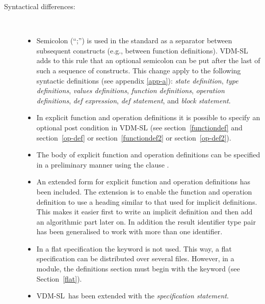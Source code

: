 \documentclass[\pformat,12pt]{article}
\newcommand{\vdmslpp}[2]{%
#1
}
\newcommand{\vdmsl}{VDM-SL}
\newcommand{\vdmpp}{VDM++}
\begin{document}
\begin{description}
\item[Syntactical differences:]\mbox{}\\
  \begin{itemize}
  
  \item Semicolon (``;'') is used in the standard as a separator
    between subsequent constructs (e.g., between function
    definitions).  \vdmslpp{\vdmsl}{\vdmpp} adds to this rule that
    an optional semicolon can be put after the last of such a sequence
    of constructs. This change apply to the following syntactic
    definitions (see appendix \ref{app-a}): \vdmslpp{{\em state
    definition},}{} {\em type definitions}, {\em values definitions},
    {\em function definitions}, {\em operation definitions}, {\em def
    expression}, {\em def statement}, and {\em block statement}.

  \item In explicit function and operation definitions it is possible
    to specify an optional post condition in 
    \vdmslpp{VDM-SL}{\vdmpp} (see section~\ref{functiondef} and
    section~\ref{op-def} or section~\ref{functiondef2} or
    section~\ref{op-def2}).

  \item The body of explicit function and operation definitions can be
    specified in a preliminary manner using the \vdmslpp{clause}{clauses
    \keyw{is subclass responsibility} and} .

    
  \item An extended form for explicit function and operation
    definitions has been included. The extension is to enable the
    function and operation definition to use a heading similar to that
    used for implicit definitions. This makes it easier first to write
    an implicit definition and then add an algorithmic part later
    on. In addition the result identifier type pair has been
    generalised to work with more than one identifier.

  \item In a flat specification the keyword  is not used.
    This way, a flat specification can be distributed over several files.
    However, in a module, the definitions section must begin with the
    keyword  (see Section~\ref{flat}).

  \item  \vdmsl\ has been extended with the {\em specification statement}.


\end{itemize}
\end{description}
\end{document}
